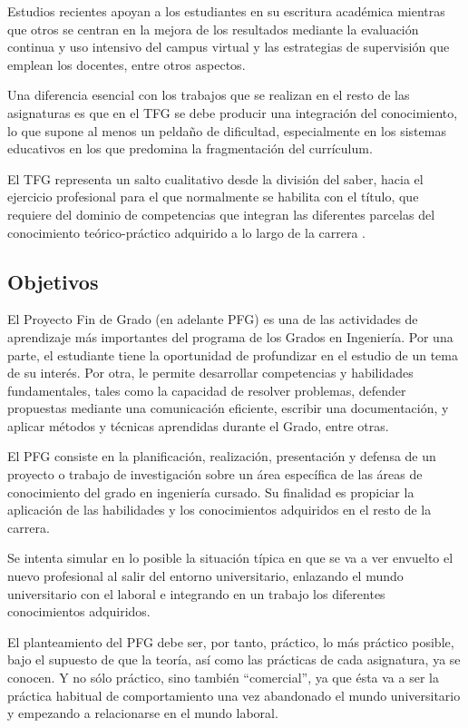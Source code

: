 Estudios recientes apoyan a los estudiantes en su escritura académica mientras que otros se centran en la mejora de los resultados mediante la evaluación continua y uso intensivo del campus virtual y las estrategias de supervisión que emplean los docentes, entre otros aspectos.

Una diferencia esencial con los trabajos que se realizan en el resto de las asignaturas es que en el TFG se debe producir una integración del conocimiento, lo que supone al menos un peldaño de dificultad, especialmente en los sistemas educativos en los que predomina la fragmentación del currículum.

El TFG representa un salto cualitativo desde la división del saber, hacia el ejercicio profesional para el que normalmente se habilita con el título, que requiere del dominio de competencias que integran las diferentes parcelas del conocimiento teórico-práctico adquirido a lo largo de la carrera \cite{definition}.

\subsection{Objetivos}

El Proyecto Fin de Grado (en adelante PFG) es una de las actividades de aprendizaje más importantes del programa de los Grados en Ingeniería. Por una parte, el estudiante tiene la oportunidad de profundizar en el estudio de un tema de su interés. Por otra, le permite desarrollar competencias y habilidades fundamentales, tales como la capacidad de resolver problemas, defender propuestas mediante una comunicación eficiente, escribir una documentación, y aplicar métodos y técnicas aprendidas durante el Grado, entre otras.

El PFG consiste en la planificación, realización, presentación y defensa de un proyecto o trabajo de investigación sobre un área específica de las áreas de conocimiento del grado en ingeniería cursado. Su finalidad es propiciar la aplicación de las habilidades y los conocimientos adquiridos en el resto de la carrera.

Se intenta simular en lo posible la situación típica en que se va a ver envuelto el nuevo profesional al salir del entorno universitario, enlazando el mundo universitario con el laboral e integrando en un trabajo los diferentes conocimientos adquiridos.

El planteamiento del PFG debe ser, por tanto, práctico, lo más práctico posible, bajo el supuesto de que la teoría, así como las prácticas de cada asignatura, ya se conocen. Y no sólo práctico, sino también “comercial”, ya que ésta va a ser la práctica habitual de comportamiento una vez abandonado el mundo universitario y empezando a relacionarse en el mundo laboral.

